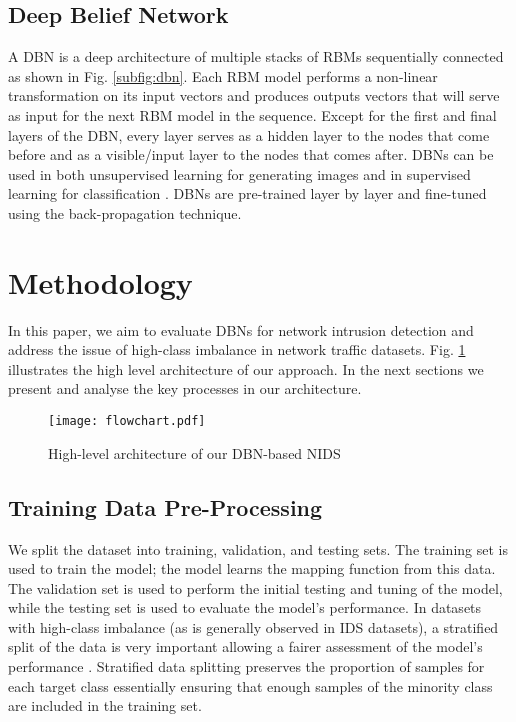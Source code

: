 \documentclass[runningheads]{llncs}
\begin{document}
\subsection{Deep Belief Network}
\label{subsec:dbn}

A \ac{DBN} is a deep architecture of multiple stacks of \acp{RBM} sequentially connected as shown in Fig. \ref{subfig:dbn}. Each \ac{RBM} model performs a non-linear transformation on its input vectors and produces outputs vectors that will serve as input for the next \ac{RBM} model in the sequence. Except for the first and final layers of the \ac{DBN}, every layer serves as a hidden layer to the nodes that come before and as a visible/input layer to the nodes that comes after. \acp{DBN} can be used in both unsupervised learning for generating images and in supervised learning for classification \cite{Salama}. \acp{DBN} are pre-trained layer by layer and fine-tuned using the back-propagation technique. \section{Methodology}
\label{sec:methodology}

In this paper, we aim to evaluate \acp{DBN} for network intrusion detection and address the issue of high-class imbalance in network traffic datasets.  Fig. \ref{fig:flowchart} illustrates the high level architecture of our approach. In the next sections we present and analyse the key processes in our architecture. 

\begin{figure}[t]
    \centering
    \texttt{[image: flowchart.pdf]}
    \caption{High-level architecture of our \ac{DBN}-based \ac{NIDS}}
    \label{fig:flowchart}
\end{figure}

\subsection{Training Data Pre-Processing}
\label{subsec:data processing}

We split the dataset into training, validation, and testing sets. The training set is used to train the model; the model learns the mapping function from this data. The validation set is used to perform the initial testing and tuning of the model, while the testing set is used to evaluate the model's performance.
In datasets with high-class imbalance (as is generally observed in \ac{IDS} datasets), a stratified split of the data is very important allowing a fairer assessment of the model's performance \cite{Hammerla}. 
Stratified data splitting preserves the proportion of samples for each target class essentially ensuring that enough samples of the minority class are included in the training set.
\end{document}

